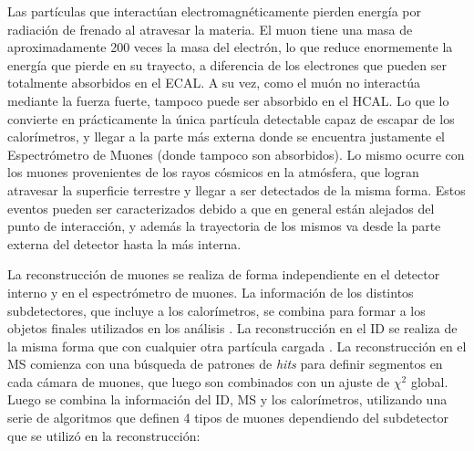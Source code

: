Las partículas que interactúan electromagnéticamente pierden energía por radiación de frenado al atravesar la materia. El muon tiene una masa de aproximadamente 200 veces la masa del electrón, lo que reduce enormemente la energía que pierde en su trayecto, a diferencia de los electrones que pueden ser totalmente absorbidos en el ECAL. A su vez, como el muón no interactúa mediante la fuerza fuerte, tampoco puede ser absorbido en el HCAL. Lo que lo convierte en prácticamente la única partícula detectable capaz de escapar de los calorímetros, y llegar a la parte más externa donde se encuentra justamente el Espectrómetro de Muones (donde tampoco son absorbidos). Lo mismo ocurre con los muones provenientes de los rayos cósmicos en la atmósfera, que logran atravesar la superficie terrestre y llegar a ser detectados de la misma forma. Estos eventos pueden ser caracterizados debido a que en general están alejados del punto de interacción, y además la trayectoria de los mismos va desde la parte externa del detector hasta la más interna.


La reconstrucción de muones se realiza de forma independiente en el detector interno y en el espectrómetro de muones. La información de los distintos subdetectores, que incluye a los calorímetros, se combina para formar a los objetos finales utilizados en los análisis \cite{PERF-2015-10}. La reconstrucción en el ID se realiza de la misma forma que con cualquier otra partícula cargada \cite{newt, silicon}. La reconstrucción en el MS comienza con una búsqueda de patrones de \textit{hits} para definir segmentos en cada cámara de muones, que luego son combinados con un ajuste de $\chi^2$ global. Luego se combina la información del ID, MS y los calorímetros, utilizando una serie de algoritmos que definen 4 tipos de muones dependiendo del subdetector que se utilizó en la reconstrucción:

